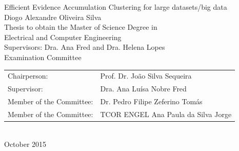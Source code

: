 \begin{center}
%
\vspace{2cm}
\vspace{3.0cm}
\vspace{1.0cm}
{\FontLb Efficient Evidence Accumulation Clustering for large datasets/big data} \\
\vspace{2.7cm}
{\FontMb Diogo Alexandre Oliveira Silva} \\
\vspace{2.0cm}
{\FontSn Thesis to obtain the Master of Science Degree in} \\
\vspace{0.3cm}
{\FontLb Electrical and Computer Engineering} \\
\vspace{1.1cm}
{\FontSn Supervisors: Dra. Ana Fred and Dra. Helena Lopes} \\
\vspace{1.1cm}
{\FontMb Examination Committee} \\
\vspace{0.3cm}
{\FontSn %
\begin{tabular}{ll}
Chairperson: & Prof. Dr. João Silva Sequeira \\
Supervisor: & Dra. Ana Luísa Nobre Fred \\
Member of the Committee: & Dr. Pedro Filipe Zeferino Tomás \\
Member of the Committee: & TCOR ENGEL Ana Paula da Silva Jorge%
\end{tabular} } \\
\vspace{1.5cm}
{\FontMb October 2015} \\
%
\end{center}

\cleardoublepage

